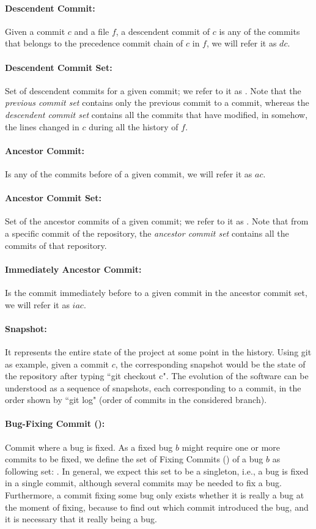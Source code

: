\documentclass[a4paper, 12pt]{book}
\begin{document}
\paragraph{\textbf{Descendent Commit:}} Given a commit $c$ and a file $f$, a descendent commit of $c$ is any of the commits that belongs to the precedence commit chain of $c$ in $f$, we will refer it as $dc$.
\paragraph{\textbf{Descendent Commit Set:}} Set of descendent commits for a given commit; we refer to it as . Note that the \emph{previous commit set} contains only the previous commit to a commit, whereas the \emph{descendent commit set} contains all the commits that have modified, in somehow, the lines changed in $c$ during all the history of $f$.
\paragraph{\textbf{Ancestor  Commit:}} Is any of the commits before of a given commit, we will refer it as $ac$.
\paragraph{\textbf{Ancestor Commit Set:}} Set of the ancestor commits of a given commit; we refer to it as . Note that from a specific commit of the repository, the \emph{ancestor commit set} contains all the commits of that repository. 
\paragraph{\textbf{Immediately Ancestor  Commit:}} Is the commit immediately before to a given commit in the ancestor commit set, we will refer it as $iac$.
\paragraph{\textbf{Snapshot:}} It represents the entire state of the project at some point in the history. Using git as example, given a commit $c$, the corresponding snapshot would be the state of the repository after typing ``git checkout c". The evolution of the software can be understood as a sequence of snapshots, each corresponding to a commit, in the order shown by ``git log" (order of commits in the considered branch). 
\paragraph{\textbf{Bug-Fixing Commit (\BFC):}} Commit where a bug is fixed. As a fixed bug $b$ might require one or more commits to be fixed, we define the set of Fixing Commits (\BFC) of a bug $b$ as following set: . In general, we expect this set to be a singleton, i.e., a bug is fixed in a single commit, although several commits may be needed to fix a bug. Furthermore, a commit fixing some bug only exists whether it is really a bug at the moment of fixing, because to find out which commit introduced the bug, and it is necessary that it really being a bug.
\end{document}
